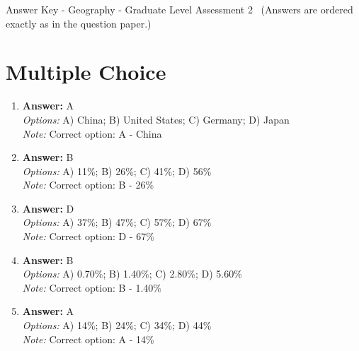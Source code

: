 \documentclass[12pt]{article}
\begin{document}
\begin{center}
Answer Key - Geography - Graduate Level Assessment 2 \
\small (Answers are ordered exactly as in the question paper.)
\end{center}

\section*{Multiple Choice}
\begin{enumerate}[label=\arabic*.]
\item \textbf{Answer:} A
\\ \textit{Options:} A) China; B) United States; C) Germany; D) Japan
\\ \textit{Note:} Correct option: A - China
\item \textbf{Answer:} B
\\ \textit{Options:} A) 11\%; B) 26\%; C) 41\%; D) 56\%
\\ \textit{Note:} Correct option: B - 26\%
\item \textbf{Answer:} D
\\ \textit{Options:} A) 37\%; B) 47\%; C) 57\%; D) 67\%
\\ \textit{Note:} Correct option: D - 67\%
\item \textbf{Answer:} B
\\ \textit{Options:} A) 0.70\%; B) 1.40\%; C) 2.80\%; D) 5.60\%
\\ \textit{Note:} Correct option: B - 1.40\%
\item \textbf{Answer:} A
\\ \textit{Options:} A) 14\%; B) 24\%; C) 34\%; D) 44\%
\\ \textit{Note:} Correct option: A - 14\%
\end{enumerate}
\end{document}
